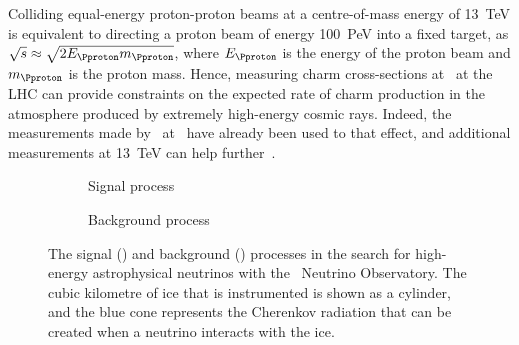 Colliding equal-energy proton-proton beams at a centre-of-mass energy of 
\SI{13}{\TeV} is equivalent to directing a proton beam of energy 
\SI{100}{\peta\eV} into a fixed target, as $\sqrts \approx 
\sqrt{2E_{\Pproton}m_{\Pproton}}$, where $E_{\Pproton}$ is the energy of the 
proton beam and $m_{\Pproton}$ is the proton mass.
Hence, measuring charm cross-sections at \ at the \ac{LHC} can 
provide constraints on the expected rate of charm production in the atmosphere 
produced by extremely high-energy cosmic rays.
Indeed, the measurements made by \lhcb\ at \ have already been used 
to that effect, and additional measurements at \SI{13}{\TeV} can help 
further~\cite{Gauld:2015yia,Bhattacharya:2015jpa}.

\begin{figure}
  \begin{subfigure}[b]{0.5\textwidth}
    \centering
    
    \caption{Signal process}
    \label{fig:prod:theory:icecube:signal}
  \end{subfigure}
  \begin{subfigure}[b]{0.5\textwidth}
    \centering
    
    \caption{Background process}
    \label{fig:prod:theory:icecube:background}
  \end{subfigure}
  \caption{%
    The signal () and background 
    () processes in the search for 
    high-energy astrophysical neutrinos with the \icecube\ Neutrino 
    Observatory.
    The cubic kilometre of ice that is instrumented is shown as a cylinder, and 
    the blue cone represents the Cherenkov radiation that can be created when a 
    neutrino interacts with the ice.
  }
  \label{fig:prod:theory:icecube}
\end{figure}

